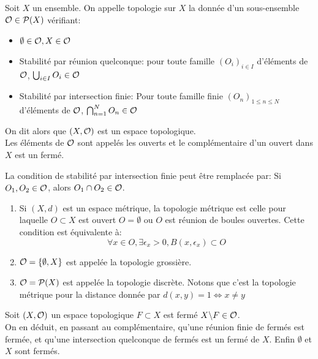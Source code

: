 \documentclass[]{report}
\begin{document}
    \begin{df}{}{}
        Soit $X$ un ensemble. On appelle topologie sur $X$ la donnée d'un sous-ensemble $\mathcal{O} \in \mathcal{P}(X)$ vérifiant:
        \begin{itemize}
            \item $\emptyset\in \mathcal{O}, X\in \mathcal{O}$
            \item Stabilité par réunion quelconque: pour toute famille $(O_i)_{i\in I}$ d'éléments de $\mathcal{O}$, $\bigcup_{i\in I} O_i\in \mathcal{O}$
            \item Stabilité par intersection finie: Pour toute famille finie $(O_n)_{1\le n\le N}$ d'éléments de $\mathcal{O}$, $\bigcap_{n=1}^{N}O_n\in \mathcal{O}$
        \end{itemize}
        On dit alors que $(X,\mathcal{O})$ est un espace topologique.\\
        Les éléments de $\mathcal{O}$ sont appelés les ouverts et le complémentaire d'un ouvert dans $X$ est un fermé.
    \end{df}

    \begin{re}{}{}
        La condition de stabilité par intersection finie peut être remplacée par: Si $O_1,O_2\in \mathcal{O}$, alors $O_1\cap O_2\in \mathcal{O}$.
    \end{re}

    \begin{ex}{}{}
        \begin{enumerate}
            \item Si $(X,d)$ est un espace métrique, la topologie métrique est celle pour laquelle $O\subset X$ est ouvert \ssi $O=\emptyset$ ou $O$ est réunion de boules ouvertes. Cette condition est équivalente à:
            \[\forall x\in O,\exists \epsilon_x>0, B(x,\epsilon_x)\subset O\]
            \item $\mathcal{O}=\{\emptyset,X\}$ est appelée la topologie grossière.
            \item $\mathcal{O}=\mathcal{P}(X)$ est appelée la topologie discrète. Notons que c'est la topologie métrique pour la distance donnée par $d(x,y)=1\iff x\neq y$
        \end{enumerate}
    \end{ex}
    
    \begin{re}{}{}
        Soit $(X,\mathcal{O})$ un espace topologique $F\subset X$ est fermé \ssi $X\backslash F\in \mathcal{O}$.\\
        On en déduit, en passant au complémentaire, qu'une réunion finie de fermés est fermée, et qu'une intersection quelconque de fermés est un fermé de $X$. Enfin $\emptyset$ et $X$ sont fermés.
    \end{re}
\end{document}
